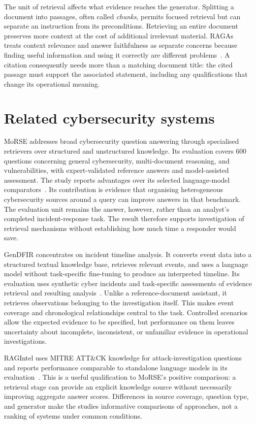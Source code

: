 The unit of retrieval affects what evidence reaches the generator. Splitting a document into passages, often called \emph{chunks}, permits focused retrieval but can separate an instruction from its preconditions. Retrieving an entire document preserves more context at the cost of additional irrelevant material. RAGAs treats context relevance and answer faithfulness as separate concerns because finding useful information and using it correctly are different problems~\cite{ref039}. A citation consequently needs more than a matching document title: the cited passage must support the associated statement, including any qualifications that change its operational meaning.

\section{Related cybersecurity systems}
MoRSE addresses broad cybersecurity question answering through specialised retrievers over structured and unstructured knowledge. Its evaluation covers 600 questions concerning general cybersecurity, multi-document reasoning, and vulnerabilities, with expert-validated reference answers and model-assisted assessment. The study reports advantages over its selected language-model comparators~\cite{ref001}. Its contribution is evidence that organising heterogeneous cybersecurity sources around a query can improve answers in that benchmark. The evaluation unit remains the answer, however, rather than an analyst's completed incident-response task. The result therefore supports investigation of retrieval mechanisms without establishing how much time a responder would save.

GenDFIR concentrates on incident timeline analysis. It converts event data into a structured textual knowledge base, retrieves relevant events, and uses a language model without task-specific fine-tuning to produce an interpreted timeline. Its evaluation uses synthetic cyber incidents and task-specific assessments of evidence retrieval and resulting analysis~\cite{ref011}. Unlike a reference-document assistant, it retrieves observations belonging to the investigation itself. This makes event coverage and chronological relationships central to the task. Controlled scenarios allow the expected evidence to be specified, but performance on them leaves uncertainty about incomplete, inconsistent, or unfamiliar evidence in operational investigations.

RAGIntel uses MITRE ATT\&CK knowledge for attack-investigation questions and reports performance comparable to standalone language models in its evaluation~\cite{ref033}. This is a useful qualification to MoRSE's positive comparison: a retrieval stage can provide an explicit knowledge source without necessarily improving aggregate answer scores. Differences in source coverage, question type, and generator make the studies informative comparisons of approaches, not a ranking of systems under common conditions.

